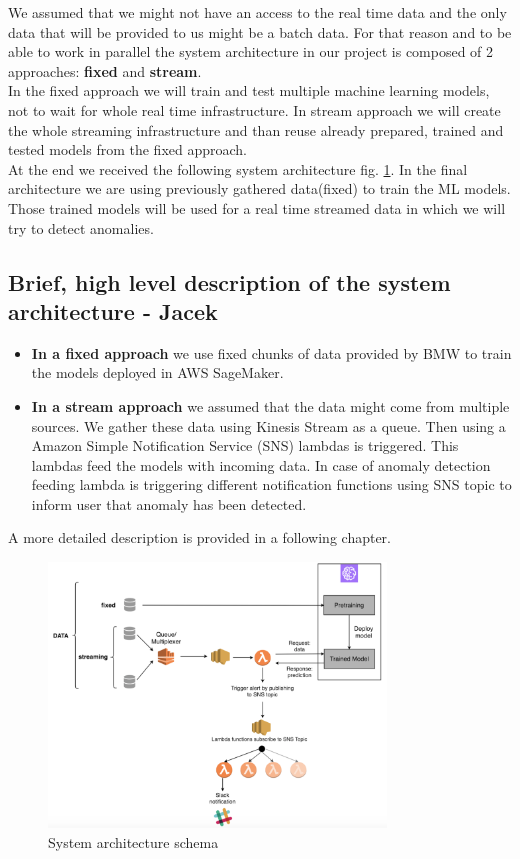 
We assumed that we might not have an access to the real time data and the only data that will be provided to us might be a batch data. For that reason and to be able to work in parallel the system architecture in our project is composed of 2 approaches: \textbf{fixed} and \textbf{stream}. \\
In the fixed approach we will train and test multiple machine learning models, not to wait for whole real time infrastructure.
In stream approach we will create the whole streaming infrastructure and than reuse already prepared, trained and tested models from the fixed approach.\\
At the end we received the following system architecture fig. \ref{fig:architecture}. In the final architecture we are using previously gathered data(fixed) to train the ML models. Those trained models will be used for a real time streamed data in which we will try to detect anomalies.  

\subsection{Brief, high level description of the system architecture - Jacek}
\begin{itemize}
\item \textbf{In a fixed approach} we use fixed chunks of data provided by BMW to train the models deployed in AWS SageMaker. 
\item \textbf{In a stream approach} we assumed that the data might come from multiple sources. We gather these data using Kinesis Stream as a queue. Then using a Amazon Simple Notification Service (SNS) lambdas is triggered. This lambdas feed the models with incoming data. In case of anomaly detection feeding lambda is triggering different notification functions using SNS topic to inform user that anomaly has been detected.
\end{itemize}

A more detailed description is provided in a following chapter.
\begin{figure}[h]
    \centering
    \includegraphics[width=0.8\textwidth]{images/sys-architecture.png}
    \caption{System architecture schema}
    \label{fig:architecture}
\end{figure}
    
